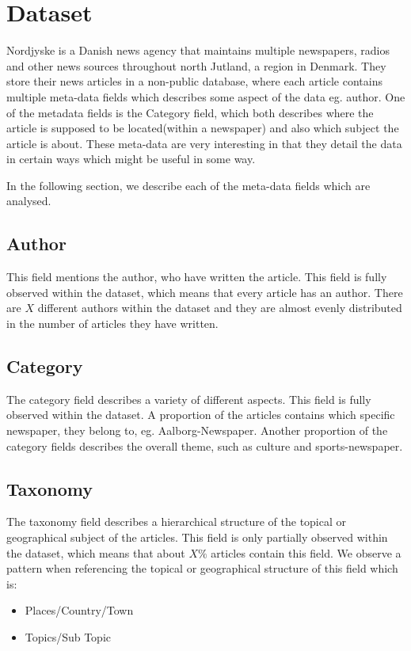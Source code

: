 \section{Dataset}
Nordjyske is a Danish news agency that maintains multiple newspapers, radios and other news sources throughout north Jutland, a region in Denmark.
They store their news articles in a non-public database, where each article contains multiple meta-data fields which describes some aspect of the data eg. author.
One of the metadata fields is the Category field, which both describes where the article is supposed to be located(within a newspaper) and also which subject the article is about.
These meta-data are very interesting in that they detail the data in certain ways which might be useful in some way.

In the following section, we describe each of the meta-data fields which are analysed.

\subsection{Author}
This field mentions the author, who have written the article.
This field is fully observed within the dataset, which means that every article has an author.
There are $X$ different authors within the dataset and they are almost evenly distributed in the number of articles they have written.

\subsection{Category}
The category field describes a variety of different aspects. 
This field is fully observed within the dataset.
A proportion of the articles contains which specific newspaper, they belong to, eg. Aalborg-Newspaper.
Another proportion of the category fields describes the overall theme, such as culture and sports-newspaper.

\subsection{Taxonomy}
The taxonomy field describes a hierarchical structure of the topical or geographical subject of the articles.
This field is only partially observed within the dataset, which means that about $X\%$ articles contain this field.
We observe a pattern when referencing the topical or geographical structure of this field which is:
\begin{itemize}
	\item Places/Country/Town
	\item Topics/Sub Topic
\end{itemize}